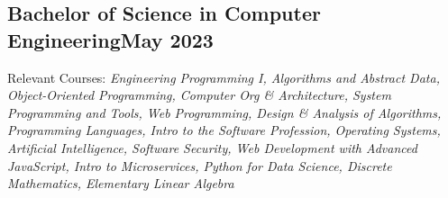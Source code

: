 \subsection{{Bachelor of Science in Computer Engineering\hfill May 2023}}
\begin{zitemize}
\item Relevant Courses: \textit{Engineering Programming I, Algorithms and Abstract Data, Object-Oriented Programming, Computer Org \& Architecture, System Programming and Tools, Web Programming, Design \& Analysis of Algorithms, Programming Languages, Intro to the Software Profession, Operating Systems, Artificial Intelligence, Software Security, Web Development with Advanced JavaScript, Intro to Microservices, Python for Data Science, Discrete Mathematics, Elementary Linear Algebra}
\end{zitemize}


